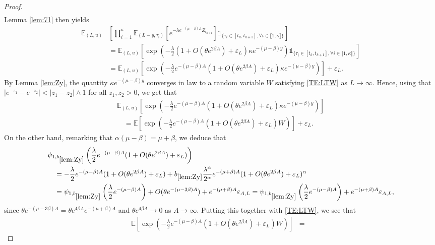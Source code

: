 \documentclass[11pt]{article}
\theoremstyle{plain}
\newcommand\vep{\varepsilon}
\begin{document}
\begin{proof}
\begin{eqnarray*}
\end{eqnarray*} 
Lemma \ref{lem:71} then yields
\begin{align*}
\mathbb{E}_{(L,u)}&\left[\prod_{i=1}^\kappa \mathbb{E}_{(L-y,\tau_i)}\left[e^{-\lambda e^{-(\mu-\beta)A} Z^{}_{t_{k+1}}}\right]\mathbb{1}_{\{\tau_i\in[t_k,t_{k+1}], \forall i\in\llbracket 1,\kappa\rrbracket\}}\right]\\
&=\mathbb{E}_{(L,u)}\left[\exp\left(-\frac{\lambda}{2}(1+O(\theta e^{2\beta A})+\vep_L)\kappa e^{-(\mu-\beta)y}\right)\mathbb{1}_{\{\tau_i\in[t_k,t_{k+1}], \forall i\in\llbracket 1,\kappa\rrbracket\}}\right]\\
&=\mathbb{E}_{(L,u)}\left[\exp\left(-\frac{\lambda}{2}e^{-(\mu-\beta)A}(1+O(\theta e^{2\beta A})+\vep_L)\kappa e^{-(\mu-\beta)y}\right)\right]+\vep_L.
\end{align*}
By Lemma \ref{lem:Zy}, the quantity $\kappa e^{-(\mu-\beta)y}$ converges in law to a random variable $W$ satisfying \eqref{TE:LTW} as $L\to\infty$. Hence, using that $|e^{-z_1}-e^{-z_2}|<|z_1-z_2|\wedge 1$ for all $z_1,z_2>0$, we get that 
\begin{multline*}
\mathbb{E}_{(L,u)}\left[\exp\left(-\frac{\lambda}{2}e^{-(\mu-\beta)A}(1+O(\theta e^{2\beta A})+\vep_L)\kappa e^{-(\mu-\beta)y}\right)\right]\\
 \quad =\mathbb{E}\left[\exp\left(-\frac{\lambda}{2}e^{-(\mu-\beta)A}(1+O(\theta e^{2\beta A})+\vep_L)W\right)\right]+\vep_L.
\end{multline*}
On the other hand, remarking that $\alpha(\mu-\beta)=\mu+\beta$, we deduce that
\begin{align*}
&\psi_{1,b_{\ref{lem:Zy}}}\left(\frac{\lambda}{2}e^{-(\mu-\beta)A}(1+O(\theta e^{2\beta A})+\vep_L)\right)\\
&\quad = -\frac{\lambda}{2}e^{-(\mu-\beta)A}(1+O(\theta e^{2\beta A})+\vep_L)+b_{\ref{lem:Zy}}\frac{\lambda^\alpha}{2^\alpha}e^{-(\mu+\beta)A}(1+O(\theta e^{2\beta A})+\vep_L)^\alpha\\
&\quad = \psi_{1,b_{\ref{lem:Zy}}}\left(\frac{\lambda}{2}e^{-(\mu-\beta)A}\right)+O(\theta e^{-(\mu-3\beta)A})+e^{-(\mu+\beta)A}\vep_{A,L}= \psi_{1,b_{\ref{lem:Zy}}}\left(\frac{\lambda}{2}e^{-(\mu-\beta)A}\right)+e^{-(\mu+\beta)A}\vep_{A,L},
\end{align*} since $\theta e^{-(\mu-3\beta)A}= \theta e^{4\beta A} e^{-(\mu+\beta)A}$ and $ \theta e^{4\beta A}\rightarrow 0$ as $A\rightarrow \infty$.
Putting this together with \eqref{TE:LTW}, we see that
\begin{eqnarray*}
\mathbb{E}\left[\exp\left(-\frac{\lambda}{2}e^{-(\mu-\beta)A}(1+O(\theta e^{2\beta A})+\vep_L)W\right)\right]&=&

\end{eqnarray*}
\end{proof}
\end{document}
